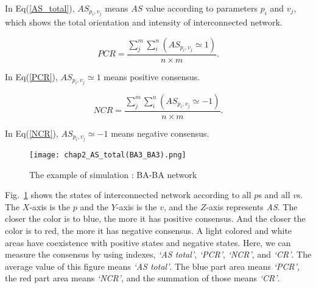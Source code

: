 In Eq(\ref{AS_total}), ${A{S_{{p _i},{v _j}}}}$ means $AS$ value according to parameters $p_i$ and $v_j$, which shows the total orientation and intensity of interconnected network.

\begin{equation}
PCR = \frac{{\sum\limits_j^m {\sum\limits_i^n {(A{S_{{p _i},{v _j}}} \simeq  1)} } }}{{n \times m}}.
\label{PCR}
\end{equation}

In Eq(\ref{PCR}),  ${A{S_{{p _i},{v _j}}} \simeq  1}$ means positive consensus.

\begin{equation}
NCR = \frac{{\sum\limits_j^m {\sum\limits_i^n {(A{S_{{p _i},{v _j}}} \simeq   - 1)} } }}{{n \times m}}.
\label{NCR}
\end{equation}

In Eq(\ref{NCR}), ${A{S_{{p _i},{v _j}}} \simeq  -1}$ means negative consensus.


\begin{figure}[!htb]
	\centering
	\texttt{[image: chap2\_AS\_total(BA3\_BA3).png]}
	\caption{The example of simulation : BA-BA network}
	\label{chap2_AS_total(BA3_BA3)}
\end{figure}

Fig.~\ref{chap2_AS_total(BA3_BA3)} shows the states of interconnected network according to all $p$s and all $v$s. The $X$-axis is the $p$ and the $Y$-axis is the $v$, and the $Z$-axis represents \textit{AS}. The closer the color is to blue, the more it has positive consensus. And the closer the color is to red, the more it has negative consensus. A light colored and white areas have coexistence with positive states and negative states. Here, we can measure the consensus by using indexes, \textit{`AS total'}, \textit{`PCR'}, \textit{`NCR'}, and \textit{`CR'}. The average value of this figure means \textit{`AS total'}. The blue part area means \textit{`PCR'}, the red part area means \textit{`NCR'}, and the summation of those means \textit{`CR'}. \\



    
